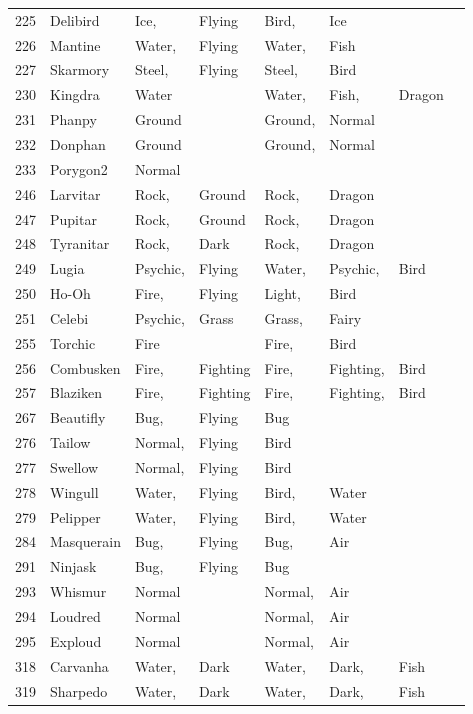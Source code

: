 \documentclass{article}
\begin{document}
\begin{longtable}{rl|ll|llll}
225 & Delibird & Ice, & Flying & Bird, & Ice &  &  \\
226 & Mantine & Water, & Flying & Water, & Fish &  &  \\
227 & Skarmory & Steel, & Flying & Steel, & Bird &  &  \\
230 & Kingdra & Water &  & Water, & Fish, & Dragon &  \\
231 & Phanpy & Ground &  & Ground, & Normal &  &  \\
232 & Donphan & Ground &  & Ground, & Normal &  &  \\
233 & Porygon2 & Normal &  &  &  &  &  \\
246 & Larvitar & Rock, & Ground & Rock, & Dragon &  &  \\
247 & Pupitar & Rock, & Ground & Rock, & Dragon &  &  \\
248 & Tyranitar & Rock, & Dark & Rock, & Dragon &  &  \\
249 & Lugia & Psychic, & Flying & Water, & Psychic, & Bird &  \\
250 & Ho-Oh & Fire, & Flying & Light, & Bird &  &  \\
251 & Celebi & Psychic, & Grass & Grass, & Fairy &  &  \\
\hline %
255 & Torchic & Fire &  & Fire, & Bird &  &  \\
256 & Combusken & Fire, & Fighting & Fire, & Fighting, & Bird &  \\
257 & Blaziken & Fire, & Fighting & Fire, & Fighting, & Bird &  \\
267 & Beautifly & Bug, & Flying & Bug &  &  &  \\
276 & Tailow & Normal, & Flying & Bird &  &  &  \\
277 & Swellow & Normal, & Flying & Bird &  &  &  \\
278 & Wingull & Water, & Flying & Bird, & Water &  &  \\
279 & Pelipper & Water, & Flying & Bird, & Water &  &  \\
284 & Masquerain & Bug, & Flying & Bug, & Air &  &  \\
291 & Ninjask & Bug, & Flying & Bug &  &  &  \\
293 & Whismur & Normal &  & Normal, & Air &  &  \\
294 & Loudred & Normal &  & Normal, & Air &  &  \\
295 & Exploud & Normal &  & Normal, & Air &  &  \\
318 & Carvanha & Water, & Dark & Water, & Dark, & Fish &  \\
319 & Sharpedo & Water, & Dark & Water, & Dark, & Fish &  \\

\end{longtable}
\end{document}
